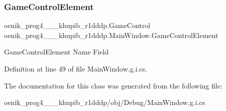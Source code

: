 \subsubsection{\texorpdfstring{GameControlElement}{GameControlElement}}
{\footnotesize\ttfamily oenik\+\_\+prog4\+\_\+\_\+\_\+khupib\+\_\+r1dddp.\+Game\+Control oenik\+\_\+prog4\+\_\+\_\+\_\+khupib\+\_\+r1dddp.\+Main\+Window.\+Game\+Control\+Element}



Game\+Control\+Element Name Field 



Definition at line 49 of file Main\+Window.\+g.\+i.\+cs.



The documentation for this class was generated from the following file\+:\begin{DoxyCompactItemize}
\item 
oenik\+\_\+prog4\+\_\+\_\+\_\+khupib\+\_\+r1dddp/obj/\+Debug/Main\+Window.\+g.\+i.\+cs\end{DoxyCompactItemize}
